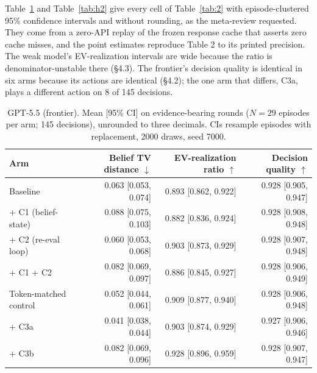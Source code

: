 \documentclass[
  10pt,
]{article}
\begin{document}
Table~\ref{tab:h1} and Table~\ref{tab:h2} give every cell of Table~\ref{tab:2} with episode-clustered 95\% confidence intervals and without rounding, as the meta-review requested. They come from a zero-API replay of the frozen response cache that asserts zero cache misses, and the point estimates reproduce Table 2 to its printed precision. The weak model's EV-realization intervals are wide because the ratio is denominator-unstable there (§4.3). The frontier's decision quality is identical in six arms because its actions are identical (§4.2); the one arm that differs, C3a, plays a different action on 8 of 145 decisions.

\begin{table}[htbp]
\centering
\footnotesize
\caption{GPT-5.5 (frontier). Mean [95\% CI] on evidence-bearing rounds ($N=29$ episodes per arm; 145 decisions), unrounded to three decimals. CIs resample episodes with replacement, 2000 draws, seed 7000.}
\label{tab:h1}
\begin{tabular}{@{}lrrr@{}}
\toprule
Arm & Belief TV distance $\downarrow$ & EV-realization ratio $\uparrow$ & Decision quality $\uparrow$ \\
\midrule
Baseline & 0.063 [0.053, 0.074] & 0.893 [0.862, 0.922] & 0.928 [0.905, 0.947] \\
\;+ C1 (belief-state) & 0.088 [0.075, 0.103] & 0.882 [0.836, 0.924] & 0.928 [0.908, 0.948] \\
\;+ C2 (re-eval loop) & 0.060 [0.053, 0.068] & 0.903 [0.873, 0.929] & 0.928 [0.907, 0.948] \\
\;+ C1 + C2 & 0.082 [0.069, 0.097] & 0.886 [0.845, 0.927] & 0.928 [0.906, 0.949] \\
Token-matched control & 0.052 [0.044, 0.061] & 0.909 [0.877, 0.940] & 0.928 [0.906, 0.948] \\
\;+ C3a & 0.041 [0.038, 0.044] & 0.903 [0.874, 0.929] & 0.927 [0.906, 0.946] \\
\;+ C3b & 0.082 [0.069, 0.096] & 0.928 [0.896, 0.959] & 0.928 [0.907, 0.947] \\
\bottomrule
\end{tabular}
\end{table}
\end{document}
